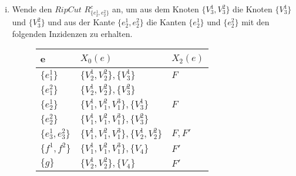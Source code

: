 \documentclass[12pt,titlepage,twoside,cleardoublepage]{article}
\theoremstyle{nummermitklammern}
\numberwithin{equation}{section}
\begin{document}
\begin{enumerate}[(i)]

\item Wende den $Rip Cut$ $R^{c}_{\{e^1_{2},e^2_{2}\}}$ an, um aus dem Knoten $\{V^1_{3},V^2_{3}\}$ die Knoten $\{V^1_{3}\}$ und $\{V^2_{3}\}$ und aus der Kante $\{e^1_{2},e^2_{2}\}$ die Kanten $\{e^1_{2}\}$ und $\{e^2_{2}\}$ mit den folgenden Inzidenzen zu erhalten. 
 \begin{figure}[H]
\begin{center}
\begin{tabularx}{\textwidth}{XXX}
\hline
\textbf{e}&\textbf{$X_0(e)$}&\textbf{$X_2(e)$}\\
 \hline
 $\{e_1^1\}$ & $\{V_2^1,V_2^2\},\{V_3^1\}$& $F$\\
  $\{e_1^2\}$ & $\{V_2^1,V_2^2\},\{V_3^2\}$&\\ 
  $\{e_2^1\}$&$\{V_1^1,V_1^2,V_1^3\},\{V_3^1\}$ & $F$\\
   $\{e_2^2\}$&$\{V_1^1,V_1^2,V_1^3\},\{V_3^2\}$ & \\
  $\{e_3^1,e_3^2\}$&$\{V_1^1,V_1^2,V_1^3\},\{V_2^1,V_2^2\}$ & $F,F'$\\ 
   $\{f^1,f^2\}$&$\{V_1^1,V_1^2,V_1^3\},\{V_4\}$& $F'$\\
   $\{g\}$ & $\{V_2^1,V_2^2\},\{V_4\}$ & $F'$ \\
 \end{tabularx}
\end{center} 
\end{figure}

  \begin{figure}[H]
\begin{tikzpicture}[line cap=round,line join=round,>=triangle 45,x=1.cm,y=1.cm]


\end{tikzpicture}
\end{figure}
\end{enumerate}
\end{document}
